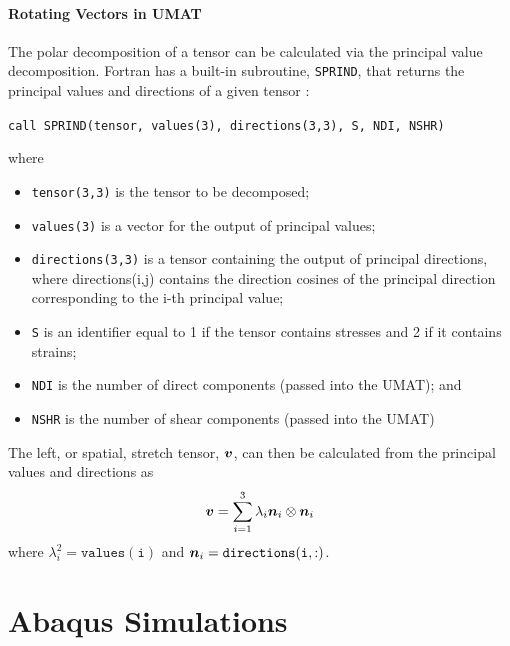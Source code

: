 \documentclass[10pt,letterpaper,oneside]{report}
\newcommand{\ten}[1]{\mbox{\boldmath $#1$}{}}
\begin{document}
\subsubsection{Rotating Vectors in UMAT}
The polar decomposition of a tensor can be calculated via the principal value decomposition.  Fortran has a built-in subroutine, \texttt{SPRIND}, that returns the principal values and directions of a given tensor :

\begin{center}
\texttt{call SPRIND(tensor, values(3), directions(3,3), S, NDI, NSHR)}
\end{center}

where 
\begin{itemize}
\item \texttt{tensor(3,3)} is the tensor to be decomposed;
\item \texttt{values(3)} is a vector for the output of principal values;
\item \texttt{directions(3,3)} is a tensor containing the output of principal directions, where directions(i,j) contains the direction cosines of the principal direction corresponding to the i-th principal value;
\item \texttt{S} is an identifier equal to 1 if the tensor contains stresses and 2 if it contains strains;
\item \texttt{NDI} is the number of direct components (passed into the UMAT); and
\item \texttt{NSHR} is the number of shear components (passed into the UMAT)
\end{itemize}

The left, or spatial, stretch tensor, $\ten{v}$, can then be calculated from the principal values and directions as 
\begin{align}
\ten{v} = \sum_{i=1}^3 \lambda_i \ten{n}_i \otimes \ten{n}_i
\end{align}
where $\lambda_i^2 = \mathtt{values(i)}$ and $\ten{n}_i = \mathtt{directions(i,:)}$.  


\chapter{Abaqus Simulations}

\end{document}
